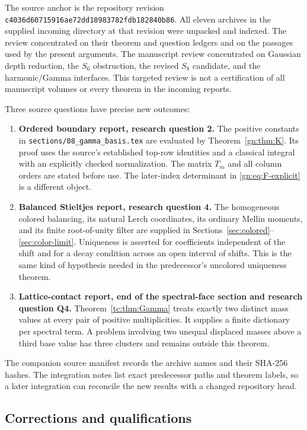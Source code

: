 \documentclass[11pt,a4paper]{article}
\numberwithin{equation}{section}
\theoremstyle{definition}
\theoremstyle{remark}
\newcommand{\src}[1]{\nolinkurl{#1}}
\newcommand{\pin}{\src{c4036d60715916ae72dd18983782fdb182840b86}}
\begin{document}
The source anchor is the repository revision \pin. All eleven archives
in the supplied incoming directory at that revision were unpacked and
indexed. The review concentrated on their theorem and question ledgers
and on the passages used by the present arguments. The manuscript
review concentrated on Gaussian depth reduction, the $S_6$ obstruction,
the revised $S_8$ candidate, and the harmonic/Gamma interfaces.
This targeted review is not a certification of all manuscript volumes
or every theorem in the incoming reports.

Three source questions have precise new outcomes:

\begin{enumerate}
\item \textbf{Ordered boundary report, research question 2.}
The positive constants in \src{sections/08_gamma_basis.tex} are
evaluated by Theorem~\ref{gn:thm:K}. Its proof uses the source's
established top-row identities and a classical integral with an
explicitly checked normalization. The matrix $T_m$ and all column
orders are stated before use. The later-index determinant in
\eqref{gn:eq:F-explicit} is a different object.

\item \textbf{Balanced Stieltjes report, research question 4.}
The homogeneous colored balancing, its natural Lerch coordinates,
its ordinary Mellin moments, and its finite root-of-unity filter
are supplied in Sections~\ref{sec:colored}--\ref{sec:color-limit}.
Uniqueness is asserted for coefficients independent of the shift
and for a decay condition across an open interval of shifts.
This is the same kind of hypothesis needed in the predecessor's
uncolored uniqueness theorem.

\item \textbf{Lattice-contact report, end of the spectral-face section
and research question Q4.}
Theorem~\ref{tc:thm:Gamma} treats exactly two distinct mass values at
every pair of positive multiplicities. It supplies a finite
dictionary per spectral term. A problem involving two unequal
displaced masses above a third base value has three clusters and
remains outside this theorem.
\end{enumerate}

The companion source manifest records the archive names and their
SHA-256 hashes. The integration notes list exact predecessor paths
and theorem labels, so a later integration can reconcile the new
results with a changed repository head.

\subsection{Corrections and qualifications}
\end{document}
